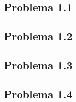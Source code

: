\subsection{Problema 1.1}

\newpage

\subsection{Problema 1.2}

\newpage

\subsection{Problema 1.3}

\newpage

\subsection{Problema 1.4}\label{problema1_4}
